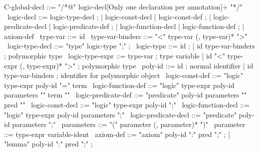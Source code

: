 \begin{syntax}
  C-global-decl ::= "/*@" logic-decl{[Only one declaration per annotation]+} "*/"
  \
  logic-decl ::= logic-type-decl ;
          | logic-const-decl | logic-const-def ;
          | logic-predicate-decl | logic-predicate-def ;
          | logic-function-decl | logic-function-def ;
          | axiom-def
  \
  type-var ::= id
  \
  type-var-binders ::= "<" type-var (, type-var)* ">"
  \
  logic-type-decl ::= "type" logic-type ";" ;
  \
  logic-type ::= id ;
  | id type-var-binders ; polymorphic type
  \
  logic-type-expr ::= type-var ; type variable
  | id "<" type-expr (, type-expr)* ">" ; polymorphic type
  \
  poly-id ::= id ; normal identifier
  | id type-var-binders ; identifier for polymorphic object
  \
  logic-const-def ::= {"logic" type-expr poly-id "=" term}
  \
  logic-function-def ::= "logic" type-expr poly-id parameters "{" term "}"
  \
  logic-predicate-def ::= "predicate" poly-id parameters "{" pred "}"
  \
  logic-const-decl ::= { "logic" type-expr poly-id ";"}
  \
  logic-function-decl ::= "logic" type-expr poly-id parameters ";"
  \
  logic-predicate-decl ::= "predicate" poly-id parameters ";"
  \
  parameters ::= "(" parameter (, parameter)* ")"
  \
  parameter ::= type-expr variable-ident
  \
  axiom-def ::= "axiom" poly-id ":" pred ";" ;
  | {"lemma" poly-id ":" pred ";" };
\end{syntax}